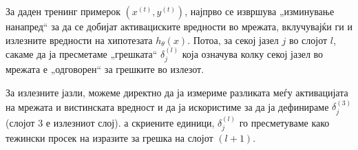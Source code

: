 За даден тренинг примерок $(x^{(t)}, y^{(t)})$, најпрво се извршува „изминување
нанапред“ за да се добијат активациските вредности во мрежата, вклучувајќи ги и
излезните вредности на хипотезата $h_\theta(x)$. Потоа, за секој јазел $j$ во
слојот $l$, сакаме да ја пресметаме „грешката“ $\delta_j^{(l)}$ која означува
колку секој јазел во мрежата е „одговорен“ за грешките во излезот.

За излезните јазли, можеме директно да ја измериме разликата меѓу активацијата
на мрежата и вистинската вредност и да ја искористиме за да ја дефинираме
$\delta_j^{(3)}$ (слојот 3 е излезниот слој). а скриените единици,
$\delta_j^{(l)}$ го пресметуваме како тежински просек на изразите за грешка на
слојот $(l + 1)$.




